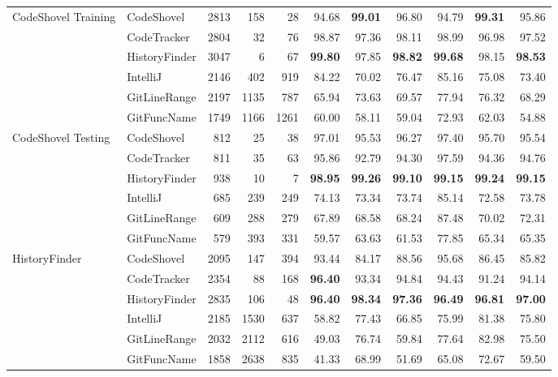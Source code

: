 \begin{table}[t]
{\begin{tabular}{llrrrrrrrrr}
\multirow{6}{*}{CodeShovel Training}
    & CodeShovel & 2813 & 158 & 28 & 94.68 & \textbf{99.01} & 96.80 & 94.79 & \textbf{99.31} & 95.86 \\
    & CodeTracker & 2804 & 32 & 76 & 98.87 & 97.36 & 98.11 & 98.99 & 96.98 & 97.52 \\
    & HistoryFinder & 3047 & 6 & 67 & \textbf{99.80} & 97.85 & \textbf{98.82} & \textbf{99.68} & 98.15 & \textbf{98.53} \\
    & IntelliJ & 2146 & 402 & 919 & 84.22 & 70.02 & 76.47 & 85.16 & 75.08 & 73.40 \\
    & GitLineRange & 2197 & 1135 & 787 & 65.94 & 73.63 & 69.57 & 77.94 & 76.32 & 68.29 \\
    & GitFuncName & 1749 & 1166 & 1261 & 60.00 & 58.11 & 59.04 & 72.93 & 62.03 & 54.88 \\
\cmidrule(lr){1-1} \cmidrule(lr){2-2} \cmidrule(lr){3-5}  \cmidrule(lr){6-8} \cmidrule(lr){9-11}
\multirow{6}{*}{CodeShovel Testing}
    & CodeShovel & 812 & 25 & 38 & 97.01 & 95.53 & 96.27 & 97.40 & 95.70 & 95.54 \\
    & CodeTracker & 811 & 35 & 63 & 95.86 & 92.79 & 94.30 & 97.59 & 94.36 & 94.76 \\
    & HistoryFinder & 938 & 10 & 7 & \textbf{98.95} & \textbf{99.26} & \textbf{99.10} & \textbf{99.15} & \textbf{99.24} & \textbf{99.15} \\
    & IntelliJ & 685 & 239 & 249 & 74.13 & 73.34 & 73.74 & 85.14 & 72.58 & 73.78 \\
    & GitLineRange & 609 & 288 & 279 & 67.89 & 68.58 & 68.24 & 87.48 & 70.02 & 72.31 \\
    & GitFuncName & 579 & 393 & 331 & 59.57 & 63.63 & 61.53 & 77.85 & 65.34 & 65.35 \\
\cmidrule(lr){1-1} \cmidrule(lr){2-2} \cmidrule(lr){3-5}  \cmidrule(lr){6-8} \cmidrule(lr){9-11}
\multirow{6}{*}{HistoryFinder}
    & CodeShovel & 2095 & 147 & 394 & 93.44 & 84.17 & 88.56 & 95.68 & 86.45 & 85.82 \\
    & CodeTracker & 2354 & 88 & 168 & \textbf{96.40} & 93.34 & 94.84 & 94.43 & 91.24 & 94.14 \\
    & HistoryFinder & 2835 & 106 & 48 & \textbf{96.40} & \textbf{98.34} & \textbf{97.36} & \textbf{96.49} & \textbf{96.81} & \textbf{97.00} \\
    & IntelliJ & 2185 & 1530 & 637 & 58.82 & 77.43 & 66.85 & 75.99 & 81.38 & 75.80 \\
    & GitLineRange & 2032 & 2112 & 616 & 49.03 & 76.74 & 59.84 & 77.64 & 82.98 & 75.50 \\
    & GitFuncName & 1858 & 2638 & 835 & 41.33 & 68.99 & 51.69 & 65.08 & 72.67 & 59.50 \\
\bottomrule
\end{tabular}
}
\end{table}

